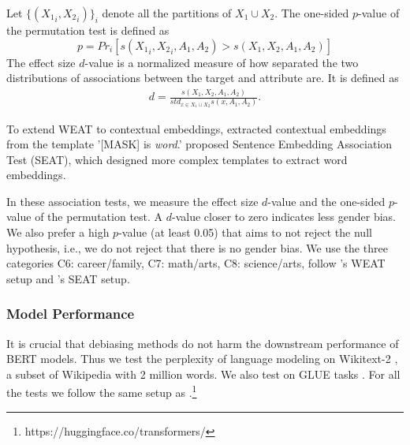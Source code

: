Let $\{({X_1}_i,{X_2}_i)\}_{i}$ denote all the partitions of $X_1\cup X_2$. The one-sided $p$-value of the permutation test is defined as $$p=Pr_i[s({X_1}_i,{X_2}_i,A_1,A_2)>s(X_1,X_2,A_1,A_2)]$$
The effect size $d$-value is a normalized measure of how separated the two distributions of associations between the target and attribute are. It is defined as
\begin{eqnarray}
d=\frac{s(X_1,X_2,A_1,A_2)}{std_{x\in X_1 \cup X_2}s(x,A_1,A_2)}.\nonumber
\end{eqnarray}

To extend WEAT to contextual embeddings, \cite{karve2019conceptor} extracted contextual embeddings from the template '[MASK] is \textit{word}.' \cite{may2019measuring} proposed Sentence Embedding Association Test (SEAT), which designed more complex templates to extract word embeddings. 

%
In these association tests, we measure the effect size $d$-value and the
one-sided $p$-value of the permutation test.  A $d$-value closer to zero indicates less gender bias.  We also prefer a high $p$-value (at least 0.05) that aims to not reject the null hypothesis, i.e., we do not reject that there is no gender bias. We use the three categories C6: career/family, C7: math/arts, C8: science/arts, follow \cite{karve2019conceptor}'s WEAT setup and \cite{may2019measuring}'s SEAT setup.

\subsubsection{Model Performance}
It is crucial that debiasing methods do not harm the downstream
performance of BERT models. Thus we test the perplexity of language modeling on Wikitext-2 \cite{merity2016pointer}, a subset of Wikipedia with 2 million words. We also test on GLUE tasks \cite{wang2018glue}. For all the tests we follow the same setup as \cite{wolf2019huggingfaces}.\footnote{https://huggingface.co/transformers/}